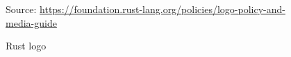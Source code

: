 \begin{figure} %
  \centering
  \def\stackalignment{r} %
  {\scriptsize \parbox[t]{\linewidth}{ Source: \url{https://foundation.rust-lang.org/policies/logo-policy-and-media-guide}} }
  \caption{Rust logo}
\end{figure}

